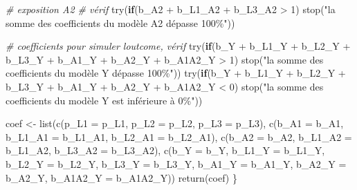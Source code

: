 \documentclass[
]{book}
\newenvironment{Shaded}{\begin{snugshade}}{\end{snugshade}}
\newcommand{\AttributeTok}[1]{\textcolor[rgb]{0.77,0.63,0.00}{#1}}
\newcommand{\CommentTok}[1]{\textcolor[rgb]{0.56,0.35,0.01}{\textit{#1}}}
\newcommand{\ControlFlowTok}[1]{\textcolor[rgb]{0.13,0.29,0.53}{\textbf{#1}}}
\newcommand{\DecValTok}[1]{\textcolor[rgb]{0.00,0.00,0.81}{#1}}
\newcommand{\FunctionTok}[1]{\textcolor[rgb]{0.00,0.00,0.00}{#1}}
\newcommand{\NormalTok}[1]{#1}
\newcommand{\OtherTok}[1]{\textcolor[rgb]{0.56,0.35,0.01}{#1}}
\newcommand{\SpecialCharTok}[1]{\textcolor[rgb]{0.00,0.00,0.00}{#1}}
\newcommand{\StringTok}[1]{\textcolor[rgb]{0.31,0.60,0.02}{#1}}
\begin{document}
\begin{Shaded}
\begin{Highlighting}[]
  \CommentTok{\# exposition A2  \# vérif}
  \FunctionTok{try}\NormalTok{(}\ControlFlowTok{if}\NormalTok{(b\_A2 }\SpecialCharTok{+}\NormalTok{ b\_L1\_A2 }\SpecialCharTok{+}\NormalTok{ b\_L3\_A2 }\SpecialCharTok{\textgreater{}} \DecValTok{1}\NormalTok{) }
    \FunctionTok{stop}\NormalTok{(}\StringTok{"la somme des coefficients du modèle A2 dépasse 100\%"}\NormalTok{))}
  
  \CommentTok{\# coefficients pour simuler l\textquotesingle{}outcome, vérif}
  \FunctionTok{try}\NormalTok{(}\ControlFlowTok{if}\NormalTok{(b\_Y }\SpecialCharTok{+}\NormalTok{ b\_L1\_Y }\SpecialCharTok{+}\NormalTok{ b\_L2\_Y }\SpecialCharTok{+}\NormalTok{ b\_L3\_Y }\SpecialCharTok{+}\NormalTok{ b\_A1\_Y }\SpecialCharTok{+}\NormalTok{ b\_A2\_Y }\SpecialCharTok{+}\NormalTok{ b\_A1A2\_Y }\SpecialCharTok{\textgreater{}} \DecValTok{1}\NormalTok{) }
    \FunctionTok{stop}\NormalTok{(}\StringTok{"la somme des coefficients du modèle Y dépasse 100\%"}\NormalTok{))}
  \FunctionTok{try}\NormalTok{(}\ControlFlowTok{if}\NormalTok{(b\_Y }\SpecialCharTok{+}\NormalTok{ b\_L1\_Y }\SpecialCharTok{+}\NormalTok{ b\_L2\_Y }\SpecialCharTok{+}\NormalTok{ b\_L3\_Y }\SpecialCharTok{+}\NormalTok{ b\_A1\_Y }\SpecialCharTok{+}\NormalTok{ b\_A2\_Y }\SpecialCharTok{+}\NormalTok{ b\_A1A2\_Y }\SpecialCharTok{\textless{}} \DecValTok{0}\NormalTok{) }
    \FunctionTok{stop}\NormalTok{(}\StringTok{"la somme des coefficients du modèle Y est inférieure à 0\%"}\NormalTok{))}
  
\NormalTok{  coef }\OtherTok{\textless{}{-}} \FunctionTok{list}\NormalTok{(}\FunctionTok{c}\NormalTok{(}\AttributeTok{p\_L1 =}\NormalTok{ p\_L1, }\AttributeTok{p\_L2 =}\NormalTok{ p\_L2, }\AttributeTok{p\_L3 =}\NormalTok{ p\_L3),}
               \FunctionTok{c}\NormalTok{(}\AttributeTok{b\_A1 =}\NormalTok{ b\_A1, }\AttributeTok{b\_L1\_A1 =}\NormalTok{ b\_L1\_A1, }\AttributeTok{b\_L2\_A1 =}\NormalTok{ b\_L2\_A1),}
               \FunctionTok{c}\NormalTok{(}\AttributeTok{b\_A2 =}\NormalTok{ b\_A2, }\AttributeTok{b\_L1\_A2 =}\NormalTok{ b\_L1\_A2, }\AttributeTok{b\_L3\_A2 =}\NormalTok{ b\_L3\_A2),}
               \FunctionTok{c}\NormalTok{(}\AttributeTok{b\_Y =}\NormalTok{ b\_Y, }\AttributeTok{b\_L1\_Y =}\NormalTok{ b\_L1\_Y, }\AttributeTok{b\_L2\_Y =}\NormalTok{ b\_L2\_Y, }\AttributeTok{b\_L3\_Y =}\NormalTok{ b\_L3\_Y,}
                 \AttributeTok{b\_A1\_Y =}\NormalTok{ b\_A1\_Y, }\AttributeTok{b\_A2\_Y =}\NormalTok{ b\_A2\_Y, }\AttributeTok{b\_A1A2\_Y =}\NormalTok{ b\_A1A2\_Y))}
  \FunctionTok{return}\NormalTok{(coef)}
\NormalTok{\}}


\end{Highlighting}
\end{Shaded}
\end{document}
